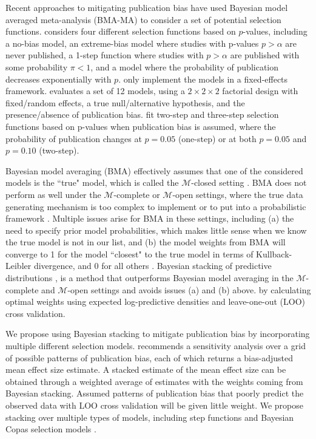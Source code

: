 \documentclass[12pt]{article}   	%
\numberwithin{equation}{section}
\begin{document}
Recent approaches to mitigating publication bias have used Bayesian model averaged meta-analysis (BMA-MA) to consider a set of potential selection functions. \citet{guan2016} considers four different selection functions based on $p$-values, including a no-bias model, an extreme-bias model where studies with p-values $p > \alpha$ are never published, a 1-step function where studies with $p > \alpha$ are published with some probability $\pi < 1$, and a model where the probability of publication decreases exponentially with $p$. \citet{guan2016} only implement the models in a fixed-effects framework. \citet{maier2020robma} evaluates a set of 12 models, using a $2 \times 2 \times 2$ factorial design with fixed/random effects, a true null/alternative hypothesis, and the presence/absence of publication bias. \citet{maier2020robma} fit two-step and three-step selection functions based on p-values when publication bias is assumed, where the probability of publication changes at $p=0.05$ (one-step) or at both $p = 0.05$ and $p = 0.10$ (two-step).  

Bayesian model averaging (BMA) effectively assumes that one of the considered models is the ``true" model, which is called the $\mathcal{M}$-closed setting \citep{bernardo2009}. BMA does not perform as well under the $\mathcal{M}$-complete or $\mathcal{M}$-open settings, where the true data generating mechanism is too complex to implement or to put into a probabilistic framework \citep{bernardo2009, le2017stacking}. Multiple issues arise for BMA in these settings, including (a) the need to specify prior model probabilities, which makes little sense when we know the true model is not in our list, and (b) the model weights from BMA will converge to 1 for the model ``closest" to the true model in terms of Kullback-Leibler divergence, and 0 for all others \citep{clyde2013bma}. Bayesian stacking of predictive distributions \citep{yao2018stacking, yao2021hierarchical}, is a method that outperforms Bayesian model averaging in the $\mathcal{M}$-complete and $\mathcal{M}$-open settings and avoids issues (a) and (b) above.  by calculating optimal weights using expected log-predictive densities and leave-one-out (LOO) cross validation. 

We propose using Bayesian stacking to mitigate publication bias by incorporating multiple different selection models. \citet{copas2001sensitivity} recommends a sensitivity analysis over a grid of possible patterns of publication bias, each of which returns a bias-adjusted mean effect size estimate. A stacked estimate of the mean effect size can be obtained through a weighted average of estimates with the weights coming from Bayesian stacking. Assumed patterns of publication bias that poorly predict the observed data with LOO cross validation will be given little weight. We propose stacking over multiple types of models, including step functions \citep{hedges1992selection, vevea1995pubbias} and Bayesian Copas selection models \citet{mavridis2013copas, bai2020}. 
\end{document}

